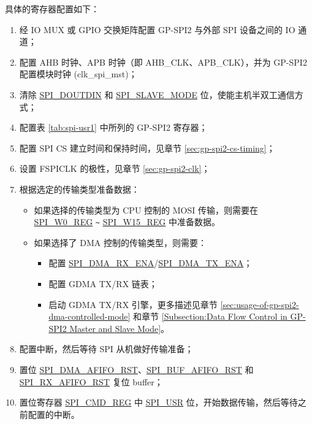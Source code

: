 \documentclass[main\_\_CN.tex]{subfiles}
\begin{document}
具体的寄存器配置如下：
\begin{enumerate}
    \item 经 IO MUX 或 GPIO 交换矩阵配置 GP-SPI2 与外部 SPI 设备之间的 IO 通道； 
    \item 配置 AHB 时钟、APB 时钟（即 AHB\_CLK、APB\_CLK），并为 GP-SPI2 配置模块时钟 (clk\_spi\_mst)；

    \item 清除 \hyperref[fielddesc:SPIDOUTDIN]{SPI\_DOUTDIN} 和 \hyperref[fielddesc:SPISLAVEMODE]{SPI\_SLAVE\_MODE} 位，使能主机半双工通信方式；
    
    \item 配置表 \ref{tab:spi-usr1} 中所列的 GP-SPI2 寄存器；
    
    \item 配置 SPI CS 建立时间和保持时间，见章节  \ref{sec:gp-spi2-cs-timing}；
    
    \item 设置 FSPICLK 的极性，见章节  \ref{sec:gp-spi2-clk}； 
    
    \item 根据选定的传输类型准备数据：
    \begin{itemize}
        \item 如果选择的传输类型为 CPU 控制的 MOSI 传输，则需要在 \hyperref[regdesc:SPIW0REG]{SPI\_W0\_REG} \verb+~+ \hyperref[regdesc:SPIW0REG]{SPI\_W15\_REG} 中准备数据。 
        
        \item 如果选择了 DMA 控制的传输类型，则需要： 
        \begin{itemize}
            \item 配置 \hyperref[fielddesc:SPIDMARXENA]{SPI\_DMA\_RX\_ENA}/\hyperref[fielddesc:SPIDMATXENA]{SPI\_DMA\_TX\_ENA}；
            \item 配置 GDMA TX/RX 链表；
            \item 启动 GDMA TX/RX 引擎，更多描述见章节  \ref{sec:usage-of-gp-spi2-dma-controlled-mode} 和章节  \ref{Subsection:Data Flow Control in GP-SPI2 Master and Slave Mode}。
        \end{itemize}
    \end{itemize}
    
    \item 配置中断，然后等待 SPI 从机做好传输准备；
    
    \item 置位 \hyperref[fielddesc:SPIDMAAFIFORST]{SPI\_DMA\_AFIFO\_RST}、\hyperref[fielddesc:SPIBUFAFIFORST]{SPI\_BUF\_AFIFO\_RST} 和 \hyperref[fielddesc:SPIRXAFIFORST]{SPI\_RX\_AFIFO\_RST} 复位 buffer；

    \item 置位寄存器 \hyperref[regdesc:SPICMDREG]{SPI\_CMD\_REG} 中 \hyperref[fielddesc:SPIUSR]{SPI\_USR} 位，开始数据传输，然后等待之前配置的中断。
\end{enumerate}
\end{document}

